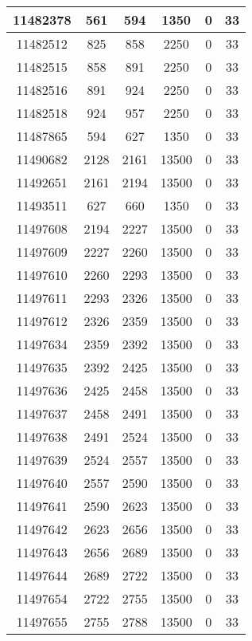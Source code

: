 \begin{appendices}
\begin{center}
\begin{longtable}{|c|c|c|c|c|c|}
11482378 & 561   & 594   & 1350  & 0     & 33  \\ \hline
11482512 & 825   & 858   & 2250  & 0     & 33  \\ \hline
11482515 & 858   & 891   & 2250  & 0     & 33  \\ \hline
11482516 & 891   & 924   & 2250  & 0     & 33  \\ \hline
11482518 & 924   & 957   & 2250  & 0     & 33  \\ \hline
11487865 & 594   & 627   & 1350  & 0     & 33  \\ \hline
11490682 & 2128  & 2161  & 13500 & 0     & 33  \\ \hline
11492651 & 2161  & 2194  & 13500 & 0     & 33  \\ \hline
11493511 & 627   & 660   & 1350  & 0     & 33  \\ \hline
11497608 & 2194  & 2227  & 13500 & 0     & 33  \\ \hline
11497609 & 2227  & 2260  & 13500 & 0     & 33  \\ \hline
11497610 & 2260  & 2293  & 13500 & 0     & 33  \\ \hline
11497611 & 2293  & 2326  & 13500 & 0     & 33  \\ \hline
11497612 & 2326  & 2359  & 13500 & 0     & 33  \\ \hline
11497634 & 2359  & 2392  & 13500 & 0     & 33  \\ \hline
11497635 & 2392  & 2425  & 13500 & 0     & 33  \\ \hline
11497636 & 2425  & 2458  & 13500 & 0     & 33  \\ \hline
11497637 & 2458  & 2491  & 13500 & 0     & 33  \\ \hline
11497638 & 2491  & 2524  & 13500 & 0     & 33  \\ \hline
11497639 & 2524  & 2557  & 13500 & 0     & 33  \\ \hline
11497640 & 2557  & 2590  & 13500 & 0     & 33  \\ \hline
11497641 & 2590  & 2623  & 13500 & 0     & 33  \\ \hline
11497642 & 2623  & 2656  & 13500 & 0     & 33  \\ \hline
11497643 & 2656  & 2689  & 13500 & 0     & 33  \\ \hline
11497644 & 2689  & 2722  & 13500 & 0     & 33  \\ \hline
11497654 & 2722  & 2755  & 13500 & 0     & 33  \\ \hline
11497655 & 2755  & 2788  & 13500 & 0     & 33  \\ \hline

\end{longtable}
\end{center}
\end{appendices}
